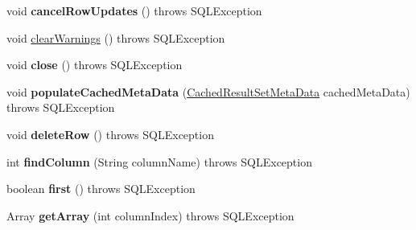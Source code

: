 \begin{DoxyCompactItemize}
\mbox{\label{classcom_1_1mysql_1_1cj_1_1jdbc_1_1result_1_1_result_set_impl_ae2ee4c2f214910978450ea90cd2ca3a8}} 
void {\bfseries cancel\+Row\+Updates} ()  throws S\+Q\+L\+Exception 
\item 
void \mbox{\hyperlink{classcom_1_1mysql_1_1cj_1_1jdbc_1_1result_1_1_result_set_impl_aa785bccb5adae1c8f447ccd47cd92ec6}{clear\+Warnings}} ()  throws S\+Q\+L\+Exception 
\item 
\mbox{\label{classcom_1_1mysql_1_1cj_1_1jdbc_1_1result_1_1_result_set_impl_a09d9ef619232fd78635a6fad7761c0f0}} 
void {\bfseries close} ()  throws S\+Q\+L\+Exception 
\item 
\mbox{\label{classcom_1_1mysql_1_1cj_1_1jdbc_1_1result_1_1_result_set_impl_ad7430baab428d355723d41517ec3ae0d}} 
void {\bfseries populate\+Cached\+Meta\+Data} (\mbox{\hyperlink{interfacecom_1_1mysql_1_1cj_1_1jdbc_1_1result_1_1_cached_result_set_meta_data}{Cached\+Result\+Set\+Meta\+Data}} cached\+Meta\+Data)  throws S\+Q\+L\+Exception 
\item 
\mbox{\label{classcom_1_1mysql_1_1cj_1_1jdbc_1_1result_1_1_result_set_impl_ade9cb9f9fd7a0609939adcc747383ba3}} 
void {\bfseries delete\+Row} ()  throws S\+Q\+L\+Exception 
\item 
\mbox{\label{classcom_1_1mysql_1_1cj_1_1jdbc_1_1result_1_1_result_set_impl_a32083ce28873f9c14bc9c3f8b1e59b4c}} 
int {\bfseries find\+Column} (String column\+Name)  throws S\+Q\+L\+Exception 
\item 
\mbox{\label{classcom_1_1mysql_1_1cj_1_1jdbc_1_1result_1_1_result_set_impl_aad1e90b6dcfe8ce0bf0cc66401fa44de}} 
boolean {\bfseries first} ()  throws S\+Q\+L\+Exception 
\item 
\mbox{\label{classcom_1_1mysql_1_1cj_1_1jdbc_1_1result_1_1_result_set_impl_af8ef8a846b00a759b9bff5b76e97423b}} 
Array {\bfseries get\+Array} (int column\+Index)  throws S\+Q\+L\+Exception 

\end{DoxyCompactItemize}
